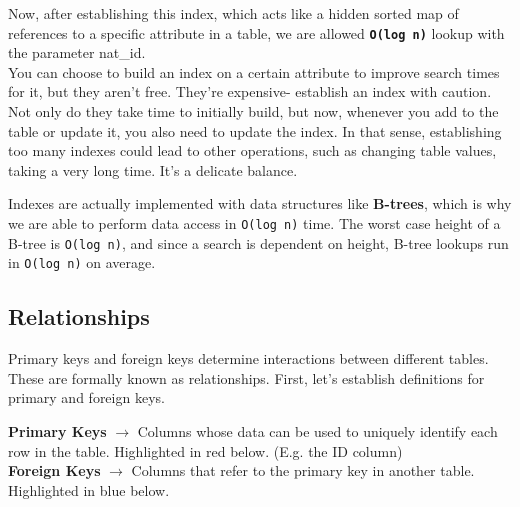 \documentclass[english, 10pt]{article}
\begin{document}
\hfill \break Now, after establishing this index, which acts like a hidden sorted map of references to a specific attribute in a table, we are allowed \texttt{\textbf{O(log n)}} lookup with the parameter nat\_id.\\

You can choose to build an index on a certain attribute to improve search times for it, but they aren't free. They're expensive- establish an index with caution. Not only do they take time to initially build, but now, whenever you add to the table or update it, you also need to update the index. In that sense, establishing too many indexes could lead to other operations, such as changing table values, taking a very long time. It's a delicate balance.\\


\begin{tcolorbox}[title=Aside: Indexes,colframe=black,colback=white,arc=0pt,fonttitle=\bfseries]
Indexes are actually implemented with data structures like \textbf{B-trees}, which is why we are able to perform data access in \texttt{O(log n)} time. The worst case height of a B-tree is \texttt{O(log n)}, and since a search is dependent on height, B-tree lookups run in \texttt{O(log n)} on average.
\end{tcolorbox}


\subsection{Relationships}

Primary keys and foreign keys determine interactions between different tables. These are formally known as relationships. First, let's establish definitions for primary and foreign keys.\\

\begin{tcolorbox}[title=Definition:,colframe=red!75!black,colback=red!5!white,arc=0pt,fonttitle=\bfseries]
\textbf{Primary Keys} $\rightarrow$ Columns whose data can be used to uniquely identify each row in the table. Highlighted in red below. (E.g. the ID column)\\
\textbf{Foreign Keys} $\rightarrow$ Columns that refer to the primary key in another table. Highlighted in blue below.
\end{tcolorbox}

\hfill \break 
\end{document}
